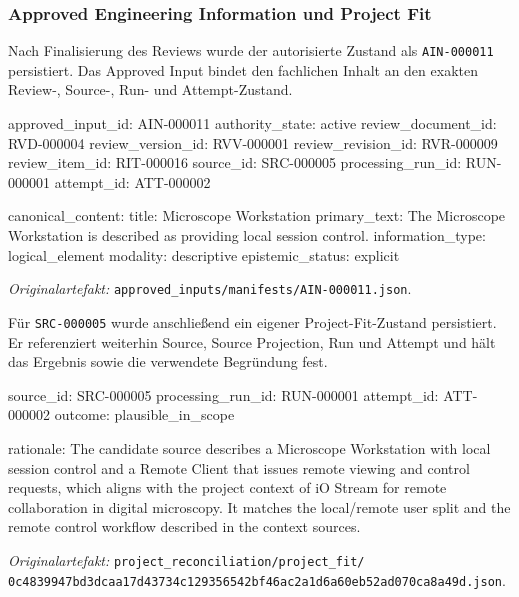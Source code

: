 \subsubsection{Approved Engineering Information und Project Fit}

Nach Finalisierung des Reviews wurde der autorisierte Zustand als
\texttt{AIN-000011} persistiert. Das Approved Input bindet den fachlichen
Inhalt an den exakten Review-, Source-, Run- und Attempt-Zustand.

\begin{evidencebox}
approved_input_id:      AIN-000011
authority_state:        active
review_document_id:     RVD-000004
review_version_id:      RVV-000001
review_revision_id:     RVR-000009
review_item_id:         RIT-000016
source_id:              SRC-000005
processing_run_id:      RUN-000001
attempt_id:             ATT-000002

canonical_content:
  title:                Microscope Workstation
  primary_text:         The Microscope Workstation is described as providing local session control.
  information_type:     logical_element
  modality:             descriptive
  epistemic_status:     explicit
\end{evidencebox}

\noindent\textit{Originalartefakt:}
\texttt{approved\_inputs/manifests/AIN-000011.json}.

Für \texttt{SRC-000005} wurde anschließend ein eigener Project-Fit-Zustand
persistiert. Er referenziert weiterhin Source, Source Projection, Run und
Attempt und hält das Ergebnis sowie die verwendete Begründung fest.

\begin{evidencebox}
source_id:         SRC-000005
processing_run_id: RUN-000001
attempt_id:        ATT-000002
outcome:           plausible_in_scope

rationale:
The candidate source describes a Microscope Workstation with local session
control and a Remote Client that issues remote viewing and control requests,
which aligns with the project context of iO Stream for remote collaboration
in digital microscopy. It matches the local/remote user split and the remote
control workflow described in the context sources.
\end{evidencebox}

\noindent\textit{Originalartefakt:} 
\texttt{project\_reconciliation/project\_fit/} \\
\texttt{0c4839947bd3dcaa17d43734c129356542bf46ac2a1d6a60eb52ad070ca8a49d.json}.

